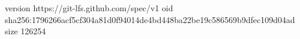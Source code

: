 version https://git-lfs.github.com/spec/v1
oid sha256:1796266acf5cf304a81d0f94014de4bd448ba22be19c586569b9dfec109d04ad
size 126254
